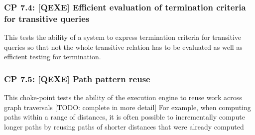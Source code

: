 \subsubsection{CP 7.4: [QEXE] Efficient evaluation of termination criteria for transitive queries}
\label{choke_point_7.4}
This tests the ability of a system to express termination criteria for transitive queries so that not the whole transitive relation has to be evaluated as well as efficient testing for termination.

\subsubsection{CP 7.5: [QEXE] Path pattern reuse}
\label{choke_point_7.5}
This choke-point tests the ability of the execution engine to reuse work across graph traversals [TODO: complete in more detail]
For example, when computing paths within a range of distances, it is often possible to incrementally compute longer paths by reusing paths of shorter distances that were already computed
